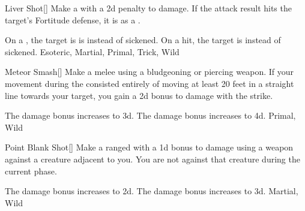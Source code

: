 \lowercase{\hypertarget{maneuver:Liver Shot}{}}\label{maneuver:Liver Shot}
\hypertarget{maneuver:Liver Shot}{}
\begin{freeability}[Rank 3]{Liver Shot}[]
Make a  with a \minus2d penalty to damage.
If the attack result hits the target's Fortitude defense,
it is  as a .

\rankline
{} On a , the target is is  instead of sickened.
 On a hit, the target is  instead of sickened.
 Esoteric, Martial, Primal, Trick, Wild
\end{freeability}
\vspace{0.25em}



\lowercase{\hypertarget{maneuver:Meteor Smash}{}}\label{maneuver:Meteor Smash}
\hypertarget{maneuver:Meteor Smash}{}
\begin{freeability}[Rank 3]{Meteor Smash}[]
Make a melee  using a bludgeoning or piercing weapon.
If your movement during the  consisted entirely of moving at least 20 feet in a straight line towards your target, you gain a \plus2d bonus to damage with the strike.

\rankline
{} The damage bonus increases to \plus3d.
 The damage bonus increases to \plus4d.
 Primal, Wild
\end{freeability}
\vspace{0.25em}



\lowercase{\hypertarget{maneuver:Point Blank Shot}{}}\label{maneuver:Point Blank Shot}
\hypertarget{maneuver:Point Blank Shot}{}
\begin{freeability}[Rank 3]{Point Blank Shot}[]
Make a ranged  with a \plus1d bonus to damage using a  weapon against a creature adjacent to you.
You are not  against that creature during the current phase.

\rankline
{} The damage bonus increases to \plus2d.
 The damage bonus increases to \plus3d.
 Martial, Wild
\end{freeability}
\vspace{0.25em}



